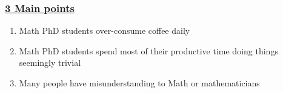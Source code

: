 \documentclass[12pt,a4paper]{article}
\begin{document}
\subsubsection*{\underline{3 Main points}}
\begin{enumerate}
\item Math PhD students over-consume coffee daily
\item Math PhD students spend most of their productive time doing things seemingly trivial
\item Many people have misunderstanding to Math or mathematicians
\end{enumerate}
%
\end{document}
